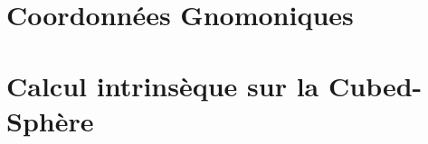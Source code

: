 %	
%









\section{Coordonnées Gnomoniques}


















\section{Calcul intrinsèque sur la Cubed-Sphère}


















